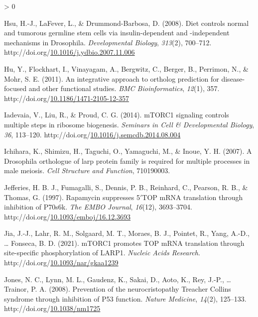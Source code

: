 \documentclass[12pt,oneside]{reedthesis}
\newlength{\cslhangindent}
\newenvironment{CSLReferences}[2] %
 {%
  \setlength{\parindent}{0pt}
  \ifodd #1 \everypar{\setlength{\hangindent}{\cslhangindent}}\ignorespaces\fi
  \ifnum #2 > 0
  \setlength{\parskip}{#2\baselineskip}
  \fi
 }%
 {}
\begin{document}
\begin{CSLReferences}{1}{0}
\leavevmode\hypertarget{ref-hsuDietControlsNormal2008}{}%
Hsu, H.-J., LaFever, L., \& Drummond-Barbosa, D. (2008). Diet controls normal and tumorous germline stem cells via insulin-dependent and -independent mechanisms in {Drosophila}. \emph{Developmental Biology}, \emph{313}(2), 700--712. http://doi.org/\href{https://doi.org/10.1016/j.ydbio.2007.11.006}{10.1016/j.ydbio.2007.11.006}

\leavevmode\hypertarget{ref-huIntegrativeApproachOrtholog2011}{}%
Hu, Y., Flockhart, I., Vinayagam, A., Bergwitz, C., Berger, B., Perrimon, N., \& Mohr, S. E. (2011). An integrative approach to ortholog prediction for disease-focused and other functional studies. \emph{BMC Bioinformatics}, \emph{12}(1), 357. http://doi.org/\href{https://doi.org/10.1186/1471-2105-12-357}{10.1186/1471-2105-12-357}

\leavevmode\hypertarget{ref-iadevaiaMTORC1SignalingControls2014}{}%
Iadevaia, V., Liu, R., \& Proud, C. G. (2014). {mTORC1} signaling controls multiple steps in ribosome biogenesis. \emph{Seminars in Cell \& Developmental Biology}, \emph{36}, 113--120. http://doi.org/\href{https://doi.org/10.1016/j.semcdb.2014.08.004}{10.1016/j.semcdb.2014.08.004}

\leavevmode\hypertarget{ref-Ichihara2007a}{}%
Ichihara, K., Shimizu, H., Taguchi, O., Yamaguchi, M., \& Inoue, Y. H. (2007). A {Drosophila} orthologue of larp protein family is required for multiple processes in male meiosis. \emph{Cell Structure and Function}, 710190003.

\leavevmode\hypertarget{ref-jefferiesRapamycinSuppressesTOP1997}{}%
Jefferies, H. B. J., Fumagalli, S., Dennis, P. B., Reinhard, C., Pearson, R. B., \& Thomas, G. (1997). Rapamycin suppresses 5{\({'}\)}{TOP mRNA} translation through inhibition of P70s6k. \emph{The EMBO Journal}, \emph{16}(12), 3693--3704. http://doi.org/\href{https://doi.org/10.1093/emboj/16.12.3693}{10.1093/emboj/16.12.3693}

\leavevmode\hypertarget{ref-jiaMTORC1PromotesTOP2021}{}%
Jia, J.-J., Lahr, R. M., Solgaard, M. T., Moraes, B. J., Pointet, R., Yang, A.-D., \ldots{} Fonseca, B. D. (2021). {mTORC1} promotes {TOP mRNA} translation through site-specific phosphorylation of {LARP1}. \emph{Nucleic Acids Research}. http://doi.org/\href{https://doi.org/10.1093/nar/gkaa1239}{10.1093/nar/gkaa1239}

\leavevmode\hypertarget{ref-jonesPreventionNeurocristopathyTreacher2008}{}%
Jones, N. C., Lynn, M. L., Gaudenz, K., Sakai, D., Aoto, K., Rey, J.-P., \ldots{} Trainor, P. A. (2008). Prevention of the neurocristopathy {Treacher Collins} syndrome through inhibition of P53 function. \emph{Nature Medicine}, \emph{14}(2), 125--133. http://doi.org/\href{https://doi.org/10.1038/nm1725}{10.1038/nm1725}


\end{CSLReferences}
\end{document}
